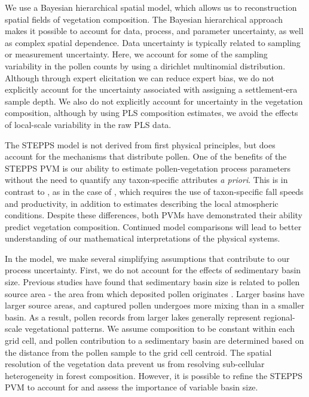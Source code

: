 \documentclass[12pt]{article}
\begin{document}
We use a Bayesian hierarchical spatial model, which allows us to
reconstruction spatial fields of vegetation composition. The Bayesian
hierarchical approach makes it possible to account for data, process,
and parameter uncertainty, as well as complex spatial dependence. Data
uncertainty is typically related to sampling or measurement
uncertainty. Here, we account for some of the sampling variability in
the pollen counts by using a dirichlet multinomial
distribution. Although through expert elicitation we can reduce expert
bias, we do not explicitly account for the uncertainty associated with
assigning a settlement-era sample depth. We also do not explicitly
account for uncertainty in the vegetation composition, although by
using PLS composition estimates, we avoid the effects of local-scale
variability in the raw PLS data.

The STEPPS model is not derived from first physical principles, but
does account for the mechanisms that distribute pollen. One of the
benefits of the STEPPS PVM is our ability to estimate
pollen-vegetation process parameters without the need to quantify any
taxon-specific attributes \textit{a priori}. This is in contrast to ,
as in the case of \citep{sugita2007theory1, sugita2007theory2}, which
requires the use of taxon-specific fall speeds and productivity, in
addition to estimates describing the local atmospheric
conditions. Despite these differences, both PVMs have demonstrated
their ability predict vegetation composition. Continued model
comparisons will lead to better understanding of our mathematical
interpretations of the physical systems.

In the model, we make several simplifying assumptions that contribute
to our process uncertainty. First, we do not account for the effects
of sedimentary basin size. Previous studies have found that
sedimentary basin size is related to pollen source area - the area
from which deposited pollen originates \citep{jacobson1981selection,
  prentice1985pollen, sugita1994pollen}. Larger basins have larger
source areas, and captured pollen undergoes more mixing than in a
smaller basin. As a result, pollen records from larger lakes generally
represent regional-scale vegetational patterns. We assume composition
to be constant within each grid cell, and pollen contribution to a
sedimentary basin are determined based on the distance from the pollen
sample to the grid cell centroid. The spatial resolution of the
vegetation data prevent us from resolving sub-cellular heterogeneity
in forest composition. However, it is possible to refine the STEPPS
PVM to account for and assess the importance of variable basin size.
\end{document}
